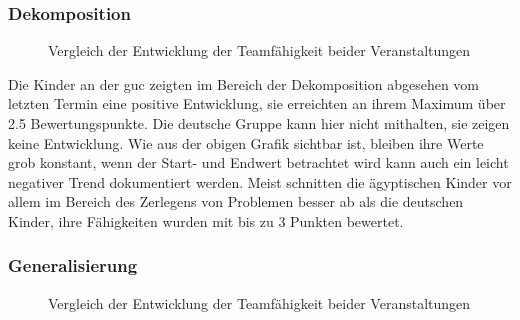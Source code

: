 \subsubsection{Dekomposition}
\begin{figure}[H]
	\centering
	\caption[Vergleich Entwicklung Teamfähigkeit beider Veranstaltungen]{Vergleich der Entwicklung der Teamfähigkeit beider Veranstaltungen}
\end{figure}

Die Kinder an der \acrlong{guc} zeigten im Bereich der Dekomposition abgesehen vom letzten Termin eine positive Entwicklung, sie erreichten an ihrem Maximum über 2.5 Bewertungspunkte. Die deutsche Gruppe kann hier nicht mithalten, sie zeigen keine Entwicklung. Wie aus der obigen Grafik sichtbar ist, bleiben ihre Werte grob konstant, wenn der Start- und Endwert betrachtet wird kann auch ein leicht negativer Trend dokumentiert werden. Meist schnitten die ägyptischen Kinder vor allem im Bereich des Zerlegens von Problemen besser ab als die deutschen Kinder, ihre Fähigkeiten wurden mit bis zu 3 Punkten bewertet. 

\subsubsection{Generalisierung}
\begin{figure}[H]
	\centering
	\caption[Vergleich Entwicklung Teamfähigkeit beider Veranstaltungen]{Vergleich der Entwicklung der Teamfähigkeit beider Veranstaltungen}
	\label{img:comparingGeneralization}
\end{figure}

